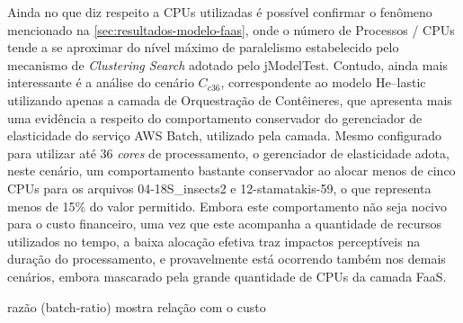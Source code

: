 \documentclass[english,brazilian]{UNISINOSmonografia} %
\begin{document}
Ainda no que diz respeito a CPUs utilizadas é possível confirmar o fenômeno mencionado na \autoref{sec:resultados-modelo-faas}, onde o número de Processos / CPUs tende a se aproximar do nível máximo de paralelismo estabelecido pelo mecanismo de \textit{Clustering Search} adotado pelo jModelTest.
%
Contudo, ainda mais interessante é a análise do cenário $C_{c36}$, correspondente ao modelo \textsf{He}--lastic utilizando apenas a camada de Orquestração de Contêineres, que apresenta mais uma evidência a respeito do comportamento conservador do gerenciador de elasticidade do serviço AWS Batch, utilizado pela camada.
%
Mesmo configurado para utilizar até 36 \textit{cores} de processamento, o gerenciador de elasticidade adota, neste cenário, um comportamento bastante conservador ao alocar menos de cinco CPUs para os arquivos 04-18S\_insects2 e 12-stamatakis-59, o que representa menos de 15\% do valor permitido.
%
Embora este comportamento não seja nocivo para o custo financeiro, uma vez que este acompanha a quantidade de recursos utilizados no tempo, a baixa alocação efetiva traz impactos perceptíveis na duração do processamento, e provavelmente está ocorrendo também nos demais cenários, embora mascarado pela grande quantidade de CPUs da camada FaaS.



razão (batch-ratio) mostra relação com o custo
\end{document}
